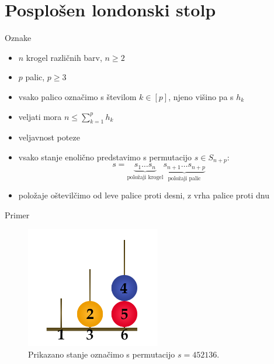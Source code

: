 \documentclass[dvipsnames]{beamer}
\begin{document}

\section{Posplošen londonski stolp}
\begin{frame}{Oznake}
    \begin{itemize}
        \item $n$ krogel različnih barv, $n \geq 2$
        \item $p$ palic, $p \geq 3$
        \item vsako palico označimo s številom $k \in [p]$, njeno višino pa s $h_k$
        \item veljati mora $n \leq \sum_{k=1}^p h_k$
        \item veljavnost poteze
        \item vsako stanje enolično predstavimo s permutacijo $s \in S_{n+p} \colon$ \[s=\underbrace{s_1 \ldots s_n}_{\text{položaji krogel}} \underbrace{s_{n+1} \ldots s_{n+p}}_{\text{položaji palic}}\]
        \item položaje oštevilčimo od leve palice proti desni, z vrha palice proti dnu
    \end{itemize}
\end{frame}

\begin{frame}{Primer}
    \begin{figure}
        \centering
        \includegraphics[height=150pt]{../img/london-tower-numbered.png}
        \caption{Prikazano stanje označimo s permutacijo $s=452136$.}
    \end{figure}
\end{frame}
\end{document}
